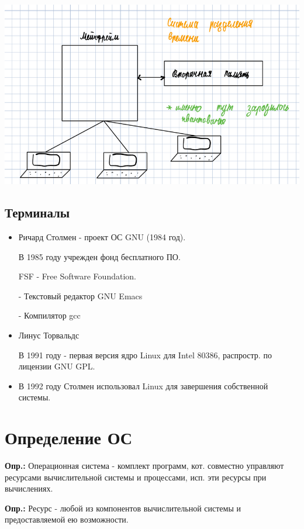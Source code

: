 \documentclass[14pt, a4paper]{article}
\begin{document}
	\includegraphics[width=\linewidth]{1}
	
	\subsection*{Терминалы}
	
	\begin{itemize}
		\item Ричард Столмен - проект ОС GNU (1984 год).
		
		В 1985 году учрежден фонд бесплатного ПО.
		
		FSF - Free Software Foundation.
		
		- Текстовый редактор GNU Emacs
		
		- Компилятор gcc
		
		\item Линус Торвальдс
		
		В 1991 году - первая версия ядро Linux для Intel 80386, распростр. по лицензии GNU GPL.
		
		\item  В 1992 году Столмен использовал Linux для завершения собственной системы.
	\end{itemize}

	\section*{Определение ОС}
	
	\textbf{Опр.:} Операционная система - комплект программ, кот. совместно управляют ресурсами вычислительной системы и процессами, исп. эти ресурсы при вычислениях.
	
	\textbf{Опр.:} Ресурс - любой из компонентов вычислительной системы и предоставляемой ею возможности.
	
\end{document}
